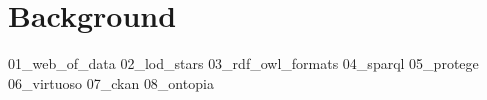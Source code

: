 \chapter{Background}
\label{chp:background}

{01_web_of_data}%
{02_lod_stars}%
{03_rdf_owl_formats}%
{04_sparql}%
{05_protege}%
{06_virtuoso}%
{07_ckan}%
{08_ontopia}%